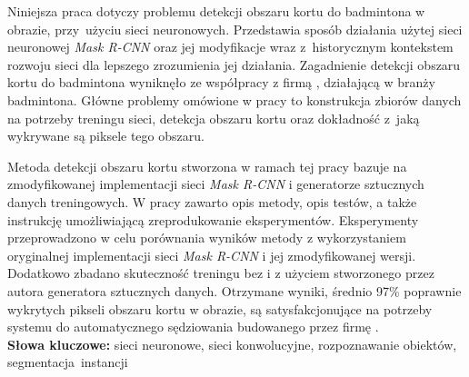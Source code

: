 Niniejsza praca dotyczy problemu detekcji obszaru kortu do badmintona w obrazie, przy~użyciu sieci neuronowych.
Przedstawia sposób działania użytej sieci neuronowej \textit{Mask R-CNN} oraz jej modyfikacje wraz z~historycznym kontekstem rozwoju sieci dla lepszego zrozumienia jej działania.
Zagadnienie detekcji obszaru kortu do badmintona wyniknęło ze współpracy z firmą \blue{}, działającą w branży badmintona.
Główne problemy omówione w pracy to konstrukcja zbiorów danych na potrzeby treningu sieci, detekcja obszaru kortu oraz dokładność z~jaką wykrywane są piksele tego obszaru.

Metoda detekcji obszaru kortu stworzona w ramach tej pracy bazuje na zmodyfikowanej implementacji sieci \textit{Mask R-CNN} i generatorze sztucznych danych treningowych.
W pracy zawarto opis metody, opis testów, a także instrukcję umożliwiającą zreprodukowanie eksperymentów. Eksperymenty przeprowadzono w celu porównania wyników metody z wykorzystaniem oryginalnej implementacji sieci \textit{Mask R-CNN} i jej zmodyfikowanej wersji.
Dodatkowo zbadano skuteczność treningu bez i z użyciem stworzonego przez autora generatora sztucznych danych. Otrzymane wyniki, średnio 97\% poprawnie wykrytych pikseli obszaru kortu w obrazie, są satysfakcjonujące na potrzeby systemu do automatycznego sędziowania budowanego przez firmę \blue{}.
\\

\noindent \textbf{Słowa kluczowe:} sieci neuronowe, sieci konwolucyjne, rozpoznawanie obiektów, segmentacja~instancji
